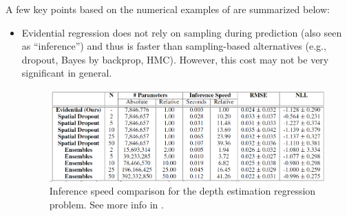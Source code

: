 A few key points based on the numerical examples of \textcite{amini2020deep} are summarized below: 
\begin{itemize}
	\item Evidential regression does not rely on sampling during prediction (also seen as ``inference'') and thus is faster than sampling-based alternatives (e.g., dropout, Bayes by backprop, HMC). 
	However, this cost may not be very significant in general. 
	\begin{figure}[H]
		\centering
		\includegraphics[width=1\linewidth]{./figs/inference_speed.png}
		\caption{Inference speed comparison for the depth estimation regression problem. See more info in \textcite{amini2020deep}.}
		\label{fig:inference:speed}
	\end{figure}


\end{itemize}

